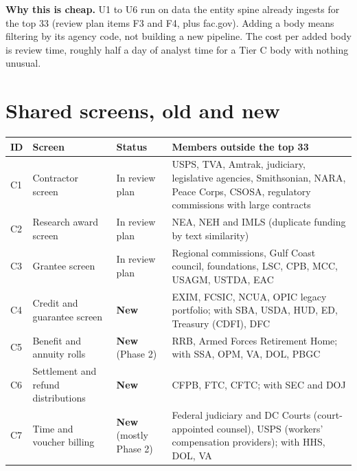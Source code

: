 \documentclass[letterpaper,11pt]{article}
\begin{document}
\textbf{Why this is cheap.} U1 to U6 run on data the entity spine
already ingests for the top 33 (review plan items F3 and F4, plus
fac.gov). Adding a body means filtering by its agency code, not building
a new pipeline. The cost per added body is review time, roughly half a
day of analyst time for a Tier C body with nothing unusual.

\hypertarget{shared-screens-old-and-new}{%
\section{Shared screens, old and new}\label{shared-screens-old-and-new}}

\begingroup\small\setlength{\tabcolsep}{4pt}\renewcommand{\arraystretch}{1.25}
\begin{longtable}[l]{@{}l>{\raggedright\arraybackslash}p{}>{\raggedright\arraybackslash}p{}>{\raggedright\arraybackslash}p{}@{}}
\rowcolor{coolblack}\leavevmode\color{white}\bfseries ID & \leavevmode\color{white}\bfseries Screen & \leavevmode\color{white}\bfseries Status & \leavevmode\color{white}\bfseries Members outside the top 33 \\
\endhead
C1 & Contractor screen & In review plan & USPS, TVA, Amtrak, judiciary, legislative agencies, Smithsonian, NARA, Peace Corps, CSOSA, regulatory commissions with large contracts \\
C2 & Research award screen & In review plan & NEA, NEH and IMLS (duplicate funding by text similarity) \\
C3 & Grantee screen & In review plan & Regional commissions, Gulf Coast council, foundations, LSC, CPB, MCC, USAGM, USTDA, EAC \\
C4 & Credit and guarantee screen & \textbf{New} & EXIM, FCSIC, NCUA, OPIC legacy portfolio; with SBA, USDA, HUD, ED, Treasury (CDFI), DFC \\
C5 & Benefit and annuity rolls & \textbf{New} (Phase 2) & RRB, Armed Forces Retirement Home; with SSA, OPM, VA, DOL, PBGC \\
C6 & Settlement and refund distributions & \textbf{New} & CFPB, FTC, CFTC; with SEC and DOJ \\
C7 & Time and voucher billing & \textbf{New} (mostly Phase 2) & Federal judiciary and DC Courts (court-appointed counsel), USPS (workers' compensation providers); with HHS, DOL, VA \\
\end{longtable}\endgroup
\end{document}

